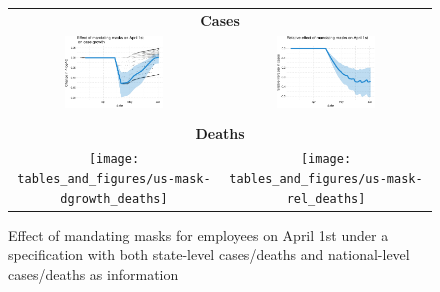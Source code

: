 \documentclass[11pt,reqno,letter]{amsart}
\theoremstyle{definition}
\begin{document}
\begin{figure}[!b]
  \caption{Effect of mandating masks for employees on April
    1st
     under a specification with both
  state-level cases/deaths and national-level cases/deaths as information
    \label{fig:US-mask-SI}}
  \begin{minipage}{\linewidth}
    \centering
    \medskip
    \begin{tabular}{cc}
      \multicolumn{2}{c}{\textbf{Cases}} \\
      \includegraphics[width=0.49\textwidth]{tables_and_figures/us-mask-dgrowth}
      &
        \includegraphics[width=0.49\textwidth]{tables_and_figures/us-mask-rel}
      \\
      \\
      \multicolumn{2}{c}{\textbf{Deaths}} \\
      \texttt{[image: tables\_and\_figures/us-mask-dgrowth\_deaths]}
      &
        \texttt{[image: tables\_and\_figures/us-mask-rel\_deaths]}
    \end{tabular}
  \end{minipage}
\end{figure}
\end{document}
